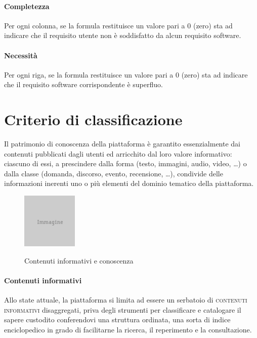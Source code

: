 \paragraph{Completezza} Per ogni colonna, se la formula restituisce un valore pari a 0 (zero) sta ad indicare che il requisito utente non è soddisfatto da alcun requisito software.

\paragraph{Necessità} Per ogni riga, se la formula restituisce un valore pari a 0 (zero) sta ad indicare che il requisito software corrispondente è superfluo.

\section{Criterio di classificazione}
\label{sec:tesi:stage:criterio-classificazione}
Il patrimonio di conoscenza della piattaforma è garantito essenzialmente dai contenuti pubblicati dagli utenti ed arricchito dal loro valore informativo: ciascuno di essi, a prescindere dalla forma (testo, immagini, audio, video, \ldots) o dalla classe (domanda, discorso, evento, recensione, \ldots), condivide delle informazioni inerenti uno o più elementi del dominio tematico della piattaforma.

\begin{figure}[ht]
\begin{center}
 \includegraphics{placeholder.png}
 \label{fig:tesi:stage:classificazione:serbatoio-contenuti}
 \caption{Contenuti informativi e conoscenza}
\end{center}
\end{figure}

\paragraph{Contenuti informativi}
Allo state attuale, la piattaforma si limita ad essere un serbatoio di \textsc{contenuti informativi} disaggregati, priva degli strumenti per classificare e catalogare il sapere custodito conferendovi una struttura ordinata, una sorta di indice enciclopedico in grado di facilitarne la ricerca, il reperimento e la consultazione.


